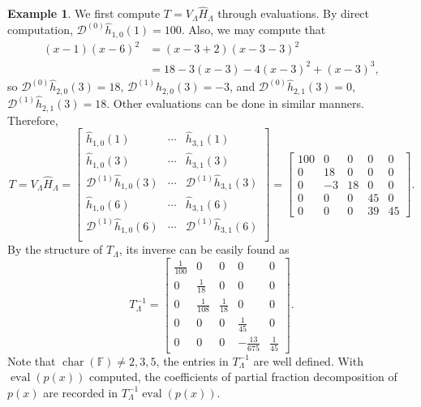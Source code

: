 \documentclass{article}
\theoremstyle{definition}
\newtheorem{example}[theorem]{Example}
\newcommand{\eval}{\operatorname{eval}}
\newcommand{\fchar}{\operatorname{char}}
\begin{document}
\begin{example}
\label{ex:parbyt}
We first compute $T = V_\Lambda \hat{H}_\Lambda$ through evaluations.  By direct computation, $\mathcal{D}^{(0)}\hat{h}_{1,0}(1) = 100$. 
Also, we may compute that 
\[
    \begin{aligned}
    (x - 1)(x - 6)^2 &= (x - 3 + 2)(x - 3 - 3)^2 \\
    & = 18 - 3(x - 3) - 4(x - 3)^2 + (x - 3)^3,
    \end{aligned}
\]
so $\mathcal{D}^{(0)}\hat{h}_{2,0}(3) = 18$, $\mathcal{D}^{(1)}\hat{h}_{2,0}(3) = -3$, and $\mathcal{D}^{(0)}\hat{h}_{2,1}(3) = 0$, $\mathcal{D}^{(1)}\hat{h}_{2,1}(3) = 18$.  Other evaluations can be done in similar manners.  Therefore, 
\[
    T = V_\Lambda \hat{H}_\Lambda = \begin{bmatrix}
        \hat{h}_{1,0}(1) & \cdots & \hat{h}_{3,1}(1) \\
        \hat{h}_{1,0}(3) & \cdots & \hat{h}_{3,1}(3) \\
        \mathcal{D}^{(1)}\hat{h}_{1,0}(3) & \cdots & \mathcal{D}^{(1)}\hat{h}_{3,1}(3) \\
        \hat{h}_{1,0}(6) & \cdots & \hat{h}_{3,1}(6) \\
        \mathcal{D}^{(1)}\hat{h}_{1,0}(6) & \cdots & \mathcal{D}^{(1)}\hat{h}_{3,1}(6) \\
    \end{bmatrix} =
    \begin{bmatrix}
        100 & 0 & 0 & 0 & 0 \\
        0 & 18 & 0 & 0 & 0 \\
        0 & -3 & 18 & 0 & 0 \\
        0 & 0 & 0 & 45 & 0 \\
        0 & 0 & 0 & 39 & 45
    \end{bmatrix}.
\]
By the structure of $T_\Lambda$, its inverse can be easily found as 
\[
    T^{-1}_\Lambda = \begin{bmatrix}
        \frac{1}{100} & 0 & 0 & 0 & 0 \\
        0 & \frac{1}{18} & 0 & 0 & 0 \\
        0 & \frac{1}{108} & \frac{1}{18} & 0 & 0 \\
        0 & 0 & 0 & \frac{1}{45} & 0 \\
        0 & 0 & 0 & -\frac{13}{675} & \frac{1}{45}
    \end{bmatrix}.
\]
Note that $\fchar(\mathbb{F}) \neq 2,3,5$, the entries in $T_\Lambda^{-1}$ are well defined.
With $\eval(p(x))$ computed, the coefficients of partial fraction decomposition of $p(x)$ are recorded in $T^{-1}_\Lambda \eval(p(x))$.  
\end{example}
\end{document}

